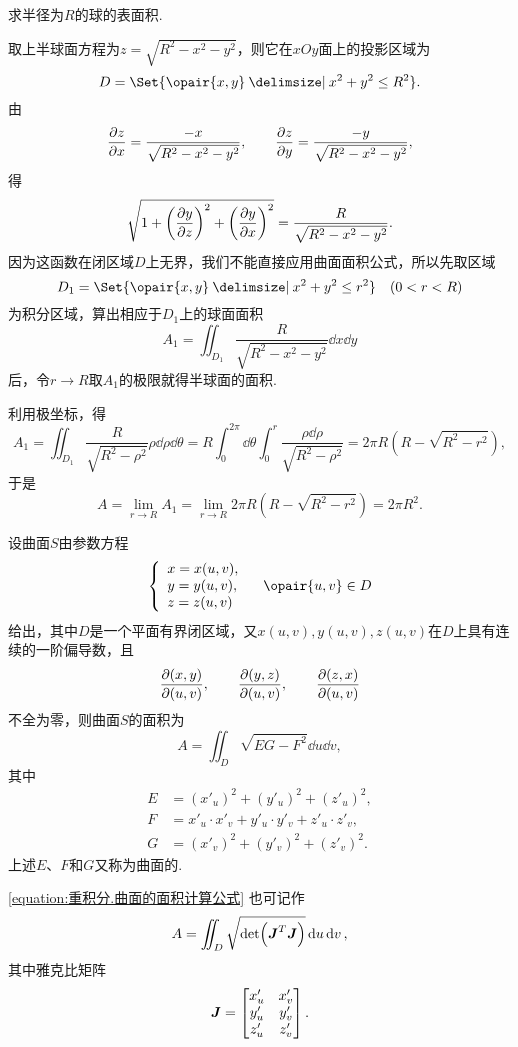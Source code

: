 \begin{example}
求半径为\(R\)的球的表面积.
\begin{solution}
\def\z{\sqrt{R^2-x^2-y^2}}
取上半球面方程为\(z = \z\)，则它在\(xOy\)面上的投影区域为\[
D = \Set{\opair{x,y} \given x^2+y^2 \leq R^2}.
\]由\[
\pdv{z}{x} = \frac{-x}{\z},
\qquad
\pdv{z}{y} = \frac{-y}{\z},
\]得\[
\sqrt{1 + \left(\pdv{y}{z}\right)^2 + \left(\pdv{y}{x}\right)^2}
= \frac{R}{\z}.
\]因为这函数在闭区域\(D\)上无界，我们不能直接应用曲面面积公式，所以先取区域\[
D_1 = \Set{\opair{x,y} \given x^2+y^2 \leq r^2}
\quad(0<r<R)
\]为积分区域，算出相应于\(D_1\)上的球面面积\[
A_1 = \iint_{D_1} \frac{R}{\z} \dd{x}\dd{y}
\]后，令\(r \to R\)取\(A_1\)的极限就得半球面的面积.

\def\zz{\sqrt{R^2-\rho^2}}
利用极坐标，得\[
A_1 = \iint_{D_1} \frac{R}{\zz} \rho\dd{\rho}\dd{\theta}
= R \int_0^{2\pi} \dd{\theta} \int_0^r \frac{\rho \dd{\rho}}{\zz}
= 2\pi R(R-\sqrt{R^2-r^2}),
\]
\def\l{\lim\limits_{r \to R}}
于是\begin{equation}
A = \l A_1
= \l 2\pi R(R-\sqrt{R^2-r^2})
= 2\pi R^2.
\end{equation}
\end{solution}
\end{example}

\begin{theorem}[利用曲面的参数方程求曲面的面积]
设曲面\(S\)由参数方程\[
\left\{ \begin{array}{l}
x = x(u,v), \\
y = y(u,v), \\
z = z(u,v) \\
\end{array} \right.
\quad
\opair{u,v} \in D
\]给出，其中\(D\)是一个平面有界闭区域，又\(x(u,v), y(u,v), z(u,v)\)在\(D\)上具有连续的一阶偏导数，且\[
\pdv{ (x,y) }{ (u,v) }, \qquad
\pdv{ (y,z) }{ (u,v) }, \qquad
\pdv{ (z,x) }{ (u,v) }
\]不全为零，则曲面\(S\)的面积为
\begin{equation}\label{equation:重积分.曲面的面积计算公式}
A = \iint_D \sqrt{E G - F^2} \dd{u}\dd{v},
\end{equation}其中\begin{align*}
E &= (x'_u)^2 + (y'_u)^2 + (z'_u)^2, \\
F &= x'_u \cdot x'_v + y'_u \cdot y'_v + z'_u \cdot z'_v, \\
G &= (x'_v)^2 + (y'_v)^2 + (z'_v)^2.
\end{align*}
\rm
上述\(E\)、\(F\)和\(G\)又称为曲面的.
\end{theorem}
\begingroup
\def\J{\mat{J}}%
\cref{equation:重积分.曲面的面积计算公式} 也可记作\[
A = \iint_D \sqrt{\det(\J^T \J)} \dd{u}\dd{v},
\]其中雅克比矩阵\[
\J = \begin{bmatrix}
x'_u & x'_v \\
y'_u & y'_v \\
z'_u & z'_v
\end{bmatrix}.
\]
\endgroup

